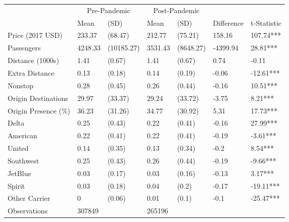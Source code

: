 
\begin{tabular}[t]{lllllll}
\toprule
\multicolumn{1}{c}{ } & \multicolumn{2}{c}{Pre-Pandemic} & \multicolumn{2}{c}{Post-Pandemic} & \multicolumn{2}{c}{ } \\
\cmidrule(l{3pt}r{3pt}){2-3} \cmidrule(l{3pt}r{3pt}){4-5}
 & Mean & (SD) & Mean & (SD) & Difference & t-Statistic\\
\midrule
Price (2017 USD) & 233.37 & (68.47) & 212.77 & (75.21) & 158.16 & 107.74***\\
Passengers & 4248.33 & (10185.27) & 3531.43 & (8648.27) & -4399.94 & 28.81***\\
Distance (1000s) & 1.41 & (0.67) & 1.41 & (0.67) & 0.74 & -0.11\\
Extra Distance & 0.13 & (0.18) & 0.14 & (0.19) & -0.06 & -12.61***\\
Nonstop & 0.28 & (0.45) & 0.26 & (0.44) & -0.16 & 10.51***\\
\addlinespace
Origin Destinations & 29.97 & (33.37) & 29.24 & (33.72) & -3.75 & 8.21***\\
Origin Presence (\%) & 36.23 & (31.26) & 34.77 & (30.92) & 5.31 & 17.73***\\
Delta & 0.25 & (0.43) & 0.22 & (0.41) & -0.16 & 27.99***\\
American & 0.22 & (0.41) & 0.22 & (0.41) & -0.19 & -3.61***\\
United & 0.14 & (0.35) & 0.13 & (0.34) & -0.2 & 8.54***\\
\addlinespace
Southwest & 0.25 & (0.43) & 0.26 & (0.44) & -0.19 & -9.66***\\
JetBlue & 0.03 & (0.17) & 0.03 & (0.16) & -0.13 & 3.17***\\
Spirit & 0.03 & (0.18) & 0.04 & (0.2) & -0.17 & -19.11***\\
Other Carrier & 0 & (0.06) & 0.01 & (0.1) & -0.1 & -25.47***\\
Observations & 307849 &  & 265196 &  &  & \\
\bottomrule
\end{tabular}
